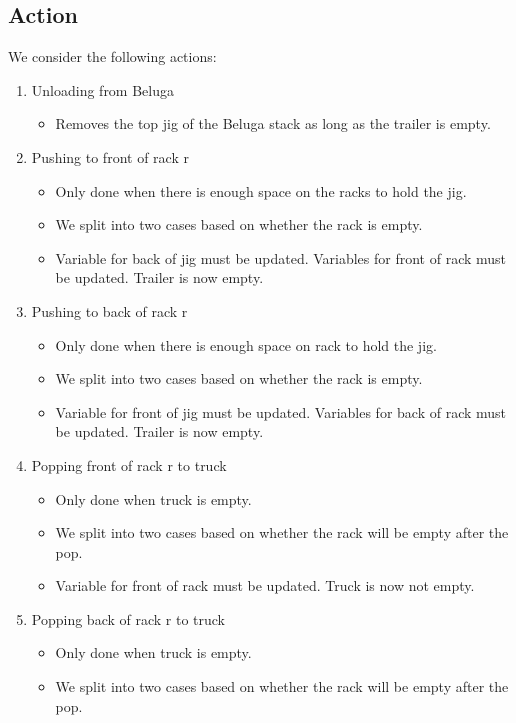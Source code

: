\documentclass{article}
\begin{document}
\subsection{Action}
We consider the following actions:
\begin{enumerate}
    \item Unloading from Beluga 
    \begin{itemize}
        \item Removes the top jig of the Beluga stack as long as the trailer is empty.
    \end{itemize}
    \item Pushing to front of rack r 
    \begin{itemize}
        \item Only done when there is enough space on the racks to hold the jig.
        \item We split into two cases based on whether the rack is empty. 
        \item Variable for back of jig must be updated. Variables for front of rack must be updated. Trailer is now empty.
    \end{itemize}
    \item Pushing to back of rack r
    \begin{itemize}
        \item Only done when there is enough space on rack to hold the jig.
        \item We split into two cases based on whether the rack is empty. 
        \item Variable for front of jig must be updated. Variables for back of rack must be updated. Trailer is now empty.
    \end{itemize}
    \item Popping front of rack r to truck
    \begin{itemize}
        \item Only done when truck is empty.
        \item We split into two cases based on whether the rack will be empty after the pop. 
        \item Variable for front of rack must be updated. Truck is now not empty.
    \end{itemize}
    \item Popping back of rack r to truck     
    \begin{itemize}
        \item Only done when truck is empty.
        \item We split into two cases based on whether the rack will be empty after the pop. 

\end{itemize}
\end{enumerate}
\end{document}

